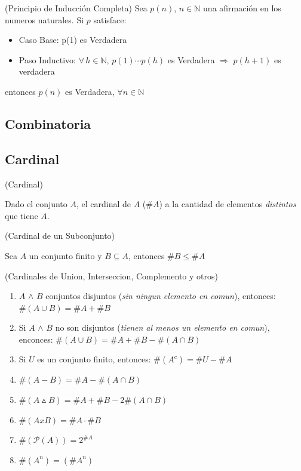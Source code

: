 \documentclass[10pt]{article}
\begin{document}
 \begin{teo}(Principio de Inducción Completa)
Sea $p(n)$, $n \in \mathbb{N}$ una afirmación en los numeros naturales. Si $p$ satisface:
\begin{itemize}
	\item Caso Base:  p(1) es Verdadera
	\item Paso Inductivo: $\forall \, h \in \mathbb{N}, \, p(1) \cdots p(h)$ es Verdadera $\Rightarrow$ $p(h +1)$ es verdadera
\end{itemize}
entonces $p(n)$ es Verdadera, $\forall n \in \mathbb{N}$
\end{teo}


\newpage
\begin{center}
 \section{Combinatoria}
 \subsection{Cardinal}
\end{center}

\begin{defi}(Cardinal)

Dado el conjunto $A$, el cardinal de $A$ ($\# A$) a la cantidad de elementos \textit{distintos} que tiene $A$.
\end{defi}

\begin{obs}(Cardinal de un Subconjunto)

Sea $A$ un conjunto finito y $B \subseteq A$, entonces $\# B \leq \# A$
\end{obs}

\begin{prop}(Cardinales de Union, Interseccion, Complemento y otros)
	
	
	\begin{enumerate}
		\item $A$ $\land$ $B$ conjuntos disjuntos (\textit{sin ningun elemento en comun}), entonces: $\#(A \cup B) = \# A + \# B$
		\item Si $A$ $\land$ $B$ no son disjuntos (\textit{tienen al menos un elemento en comun}), enconces:  $\#(A \cup B) = \# A + \# B - \#(A \cap B)$
		\item Si $U$ es un conjunto finito, entonces: $\#(A^c) = \# U - \# A$
		\item $\#(A-B) = \#A - \#(A \cap B)$
		\item $\#(A \vartriangle B) = \# A + \# B - 2 \#(A \cap B)$
		\item $\#(A x B) = \#A \cdot \#B$
		\item $\#(\mathcal{P}(A)) = 2^{\#A}$
		\item $\# (A^n) = (\# A^n)$
		
	\end{enumerate}
\end{prop}
\end{document}
